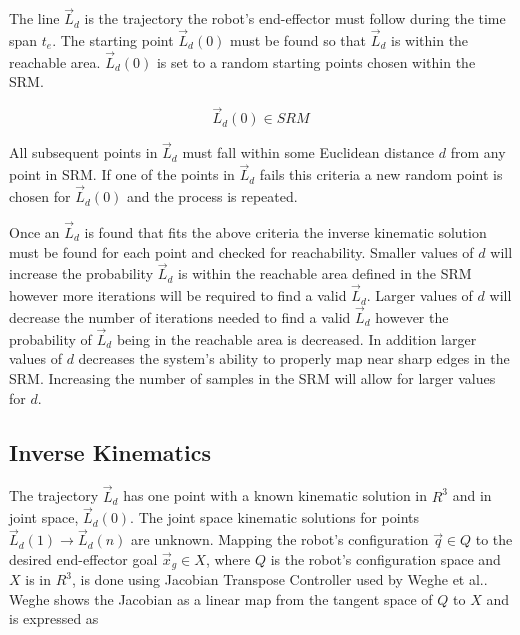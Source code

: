 
The line $\vec{L}_d$ is the trajectory the robot's end-effector must follow during the time span $t_e$.  The starting point $\vec{L}_d(0)$ must be found so that $\vec{L}_d$ is within the reachable area.  $\vec{L}_d(0)$ is set to a random starting points chosen within the SRM.  

\begin{equation}
\vec{L}_d(0) \in SRM
\end{equation}

All subsequent points in $\vec{L}_d$ must fall within some Euclidean distance $d$ from any point in SRM.  If one of the points in $\vec{L}_d$ fails this criteria a new random point is chosen for $\vec{L}_d(0)$ and the process is repeated. 

Once an $\vec{L}_d$ is found that fits the above criteria the inverse kinematic solution must be found for each point and checked for reachability.  Smaller values of $d$ will increase the probability $\vec{L}_d$ is within the reachable area defined in the SRM however more iterations will be required to find a valid $\vec{L}_d$.  Larger values of $d$ will decrease the number of iterations needed to find a valid $\vec{L}_d$ however the probability of $\vec{L}_d$ being in the reachable area is decreased.  In addition larger values of $d$ decreases the system's ability to properly map near sharp edges in the SRM.  Increasing the number of samples in the SRM will allow for larger values for $d$.

\subsection{Inverse Kinematics}\label{sec:ik}
The trajectory $\vec{L}_d$ has one point with a known kinematic solution in $R^3$ and in joint space, $\vec{L}_d(0)$.  The joint space kinematic solutions for points $\vec{L}_d(1) \rightarrow \vec{L}_d(n)$ are unknown.  Mapping the robot's configuration $\vec{q} \in Q$ to the desired end-effector goal $\vec{x}_g \in X$, where $Q$ is the robot's configuration space and $X$ is in $R^3$, is done using Jacobian Transpose Controller used by Weghe et al.\cite{4813913}.  Weghe shows the Jacobian as a linear map from the tangent space of $Q$ to $X$ and is expressed as

